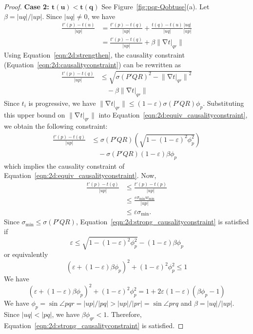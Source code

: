 \documentclass[twocolumn]{article}
\def\minW{\ensuremath{w_{\text{min}}}}
\def\S{\ensuremath{\sigma}}
\def\minS{\ensuremath{\S_{\text{min}}}}
\def\e{\ensuremath{\varepsilon}}
\def\fp{\ensuremath{P}}
\def\fq{\ensuremath{Q}}
\def\fr{\ensuremath{R}}
\DeclareMathOperator{\grad}{\ensuremath{\nabla}}
\def\abs#1{\ensuremath{\mathopen| #1 \mathclose|}}
\def\norm#1{\ensuremath{\mathopen\| #1 \mathclose\|}}
\def\rest#1#2{\ensuremath{\left. #1 \right|_{#2}}}
\begin{document}
\begin{proof}
\noindent\textbf{Case 2: $\mathbf{t(u) < t(q)}$}
See Figure~\ref{fig:pqr-Qobtuse}(a).  Let $\beta = \abs{uq}/\abs{up}$.
Since $\abs{uq} \ne 0$, we have
\begin{align}
  \frac{t'(p) - t(u)}{\abs{up}}
&= 
  \frac{t'(p) - t(q)}{\abs{up}} 
+ 
  \frac{t(q) - t(u)}{\abs{uq}} \frac{\abs{uq}}{\abs{up}}\nonumber\\
&= 
  \frac{t'(p) - t(q)}{\abs{up}} 
+ 
  \beta \norm{\grad \rest{t}{qr}}
\label{eqn:2d:strengthen}
\end{align}
Using Equation~\ref{eqn:2d:strengthen}, the causality constraint
(Equation~\ref{eqn:2d:causalityconstraint}) can be rewritten as
\begin{align}
  \frac{t'(p) - t(q)}{\abs{up}}
&\le 
  \sqrt{\S(\fp'\fq\fr)^2 
    - \norm{\grad \rest{t}{qr}}^2}\nonumber\\
&\quad {}-{} \beta \norm{\grad \rest{t}{qr}}
\label{eqn:2d:equiv_causalityconstraint}
\end{align}
Since $t_i$ is progressive, we have $\norm{\grad \rest{t}{qr}} \le
(1-\e) \S(\fp'\fq\fr) \phi_p$.  Substituting
this upper bound on $\norm{\grad \rest{t}{qr}}$ into
Equation~\ref{eqn:2d:equiv_causalityconstraint}, we obtain the
following constraint:
\begin{align}
  \frac{t'(p) - t(q)}{\abs{up}}
&\le 
  \S(\fp'\fq\fr) \left( \sqrt{1 - (1-\e)^2 \phi_p^2} \right)\nonumber\\
&\quad {}-{} \S(\fp'\fq\fr) (1-\e) \beta \phi_p
\label{eqn:2d:strong_causalityconstraint}
\end{align}
which implies the causality constraint of
Equation~\ref{eqn:2d:equiv_causalityconstraint}.
Now,
\begin{align*}
\frac{t'(p) - t(q)}{\abs{up}}
&\le 
  \frac{t'(p) - t(p)}{\abs{up}}\\
&\le
  \frac{\e \minS \minW}{\abs{up}}\\
&\le
  \e \minS.
\end{align*}
Since $\minS \le \S(\fp'\fq\fr)$,
Equation~\ref{eqn:2d:strong_causalityconstraint} is satisfied if
\[
  \e \le \sqrt{1 - (1-\e)^2 \phi_p^2} - (1-\e) \beta \phi_p
\]
or equivalently
\[
  \left( \e + (1-\e) \beta \phi_p \right)^2 
+
  (1-\e)^2 \phi_p^2
\le
  1
\]
We have
\[
  \left( \e + (1-\e) \beta \phi_p \right)^2 
+
  (1-\e)^2 \phi_p^2
=
  1 + 2 \e (1-\e) \left( \beta \phi_p - 1 \right)
\]
We have $\phi_p = \sin \angle{pqr} = \abs{up}/\abs{pq} >
\abs{up}/\abs{pr} = \sin \angle{prq}$ and $\beta = \abs{uq}/\abs{up}$.
Since $\abs{uq} < \abs{pq}$, we have $\beta \phi_{qr} < 1$.
Therefore, Equation~\ref{eqn:2d:strong_causalityconstraint} is
satisfied.
\end{proof}
\end{document}

